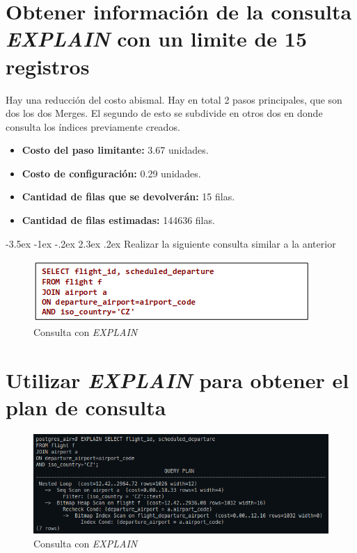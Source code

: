 \documentclass[11pt]{report}
\makeatletter
\renewcommand\chapter{\@startsection{chapter}{0}{\z@}%
    {-3.5ex \@plus -1ex \@minus -.2ex}%
    {2.3ex \@plus.2ex}%
    {\normalfont\Large\bfseries}}
\makeatother
\begin{document}
\section{Obtener información de la consulta \emph{EXPLAIN} con un limite de 15 registros}
Hay una reducción del costo abismal. Hay en total 2 pasos principales, que son dos los
dos Merges. El segundo de esto se subdivide en otros dos en donde consulta los índices
previamente creados.

\begin{itemize}
  \item \textbf{Costo del paso limitante:} 3.67 unidades.
  \item \textbf{Costo de configuración:}  0.29 unidades.
  \item \textbf{Cantidad de filas que se devolverán:} 15 filas.
  \item \textbf{Cantidad de filas estimadas:} 144636 filas.
\end{itemize}

\cleardoublepage

\chapter{Realizar la siguiente consulta similar a la anterior}
\begin{figure}[H]
  \centering
  \includegraphics[scale=0.8]{img/consulta_CZ.png}
  \caption{Consulta con \emph{EXPLAIN}}
  \label{fig:consulta con EXPLAIN 2}
\end{figure}

\section{Utilizar \emph{EXPLAIN} para obtener el plan de consulta}
\begin{figure}[H]
  \centering
  \includegraphics[scale=0.55]{img/consulta_explain_CZ.png}
  \caption{Consulta con \emph{EXPLAIN}}
  \label{fig:consulta con EXPLAIN CZ}
\end{figure}
\end{document}
